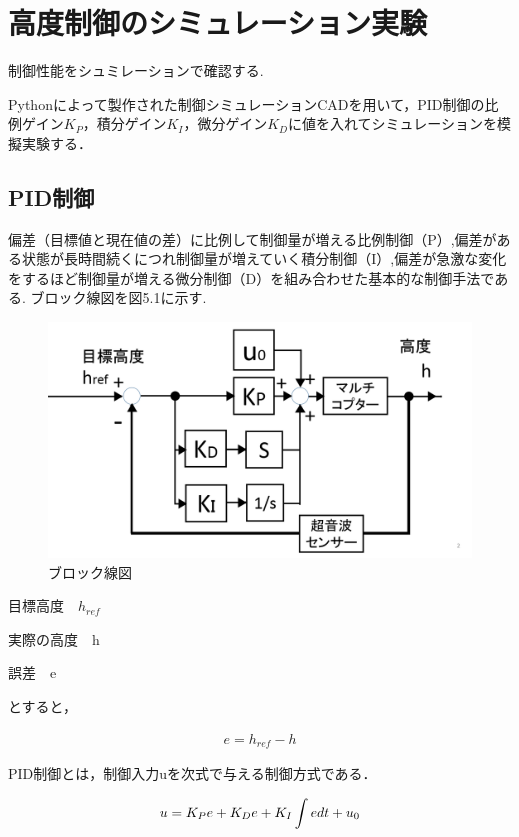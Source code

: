 \chapter{高度制御のシミュレーション実験}
制御性能をシュミレーションで確認する.

Pythonによって製作された制御シミュレーションCADを用いて，PID制御の比例ゲイン$K_P$，積分ゲイン$K_I$，微分ゲイン$K_D$に値を入れてシミュレーションを模擬実験する．

\section{PID制御}
偏差（目標値と現在値の差）に比例して制御量が増える比例制御（P）,偏差がある状態が長時間続くにつれ制御量が増えていく積分制御（I）,偏差が急激な変化をするほど制御量が増える微分制御（D）を組み合わせた基本的な制御手法である.
ブロック線図を図5.1に示す.

\begin{figure}[htbp]
  \begin{center}
   \includegraphics[width=150mm]{img/ブロック線図.png}
    \end{center}
  \caption{ブロック線図}
 \label{fig:ensyu3tex}
\end{figure}


目標高度　$h_{ref}$

実際の高度　h

誤差　e

とすると，

\begin{eqnarray}
e=h_{ref}-h
\end{eqnarray}

PID制御とは，制御入力uを次式で与える制御方式である．

\begin{eqnarray}
u=K_P\large{e}+K_D \large{e}+K_I\int\large{e}dt+u_0
\end{eqnarray}

